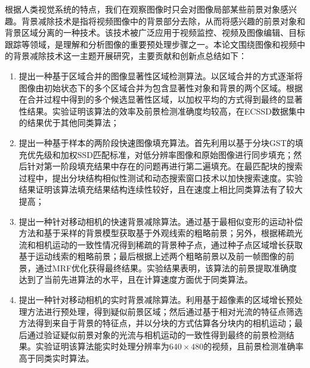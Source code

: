 \begin{cabstract}
根据人类视觉系统的特点，我们在观察图像时只会对图像局部某些前景对象感兴趣。背景减除技术是指将视频图像中的背景部分去除，从而将感兴趣的前景对象和背景区域分离的一种技术。该技术被广泛应用于视频监控、视频及图像编辑、目标跟踪等领域，是理解和分析图像的重要预处理步骤之一。本论文围绕图像和视频中的背景减除技术这一主题开展研究，主要贡献和创新点总结如下：
\begin{enumerate}
  \item 提出一种基于区域合并的图像显著性区域检测算法。以区域合并的方式逐渐将图像由初始状态下的多个区域合并为包含显著性对象和背景的两个区域。根据在合并过程中得到的多个候选显著性区域，以加权平均的方式得到最终的显著性结果。实验证明该算法的效率及前景检测准确度均较高，在ECSSD数据集中的结果优于其他同类算法；

  \item 提出一种基于样本的两阶段快速图像填充算法。首先利用以基于分块GST的填充优先级和加权SSD匹配标准，对低分辨率图像和原始图像进行同步填充；然后针对第一阶段填充结果中存在的问题再进行第二遍填充。在最匹配块的搜索过程中，提出分块结构相似性测试和动态搜索窗口技术以加快搜索速度。实验结果证明该算法填充结果结构连续性较好，且在速度上相比同类算法有了较大提高；
  \item 提出一种针对移动相机的快速背景减除算法。通过基于最相似变形的运动补偿方法和基于采样的背景模型获取基于外观线索的粗略前景；另外，根据稀疏光流和相机运动的一致性情况得到稀疏的背景种子点，通过种子点区域增长获取基于运动线索的粗略前景；最后根据上述两个粗略前景以及前一帧图像的前景，通过MRF优化获得最终结果。实验结果表明，该算法的前景提取准确度达到了当前先进算法的水平，且在计算速度方面优于同类算法。
  \item 提出一种针对移动相机的实时背景减除算法。利用基于超像素的区域增长预处理方法进行预处理，得到疑似前景区域；然后通过基于相对光流的特征点筛选方法得到来自于背景的特征点，并以分块的方式估算各分块内的相机运动；最后通过验证疑似前景对象的光流与相机运动的一致性得到最终的前景检测结果。实验证明该算法能实时处理分辨率为$640 \times 480$的视频，且前景检测准确率高于同类实时算法。
\end{enumerate}

\end{cabstract}



